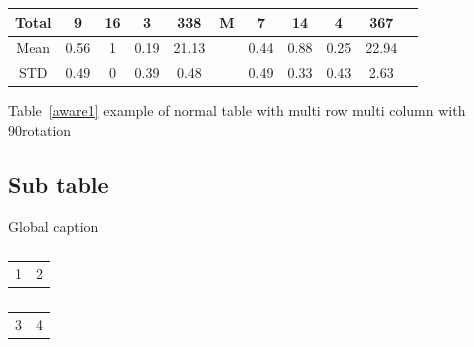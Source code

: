 \begin{table}[H]
{\begin{tabular}{|c|c|c|c|c|c|c|c|c|c|c|}
Total                                                                          & 9           & 16          & 3           & 338          & M            & 7           & 14          & 4           & 367          &              \\ \hline
Mean                                                                           & 0.56        & 1           & 0.19        & 21.13        &              & 0.44        & 0.88        & 0.25        & 22.94        &              \\ \hline
STD                                                                            & 0.49        & 0           & 0.39        & 0.48         &              & 0.49        & 0.33        & 0.43        & 2.63         &              \\ \hline
\end{tabular}}
\end{table}
Table~\ref{aware1} example of normal table with multi row multi column with 90\degree rotation
\subsection{Sub table}\label{subtable}
\begin{table}[!htb]
    \caption{Global caption}
    \begin{subtable}{.5\linewidth}
      \centering
        \caption{}
        \begin{tabular}{ll}
            1 & 2
        \end{tabular}
    \end{subtable}%
    \begin{subtable}{.5\linewidth}
      \centering
        \caption{}
        \begin{tabular}{ll}
            3 & 4
        \end{tabular}
    \end{subtable} 
\end{table}